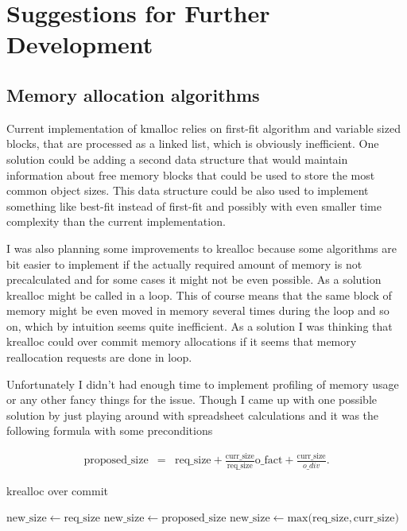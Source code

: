 \section{Suggestions for Further Development}

\subsection{Memory allocation algorithms}

Current implementation of kmalloc relies on first-fit algorithm and variable
sized blocks, that are processed as a linked list, which is obviously inefficient.
One solution could be adding a second data structure that would maintain
information about free memory blocks that could be used to store the most common
object sizes. This data structure could be also used to implement something like
best-fit instead of first-fit and possibly with even smaller time complexity than
the current implementation.

I was also planning some improvements to krealloc because some algorithms are
bit easier to implement if the actually required amount of memory is not
precalculated and for some cases it might not be even possible. As a solution
krealloc might be called in a loop. This of course means that the same block
of memory might be even moved in memory several times during the loop and so
on, which by intuition seems quite inefficient. As a solution I was thinking
that krealloc could over commit memory allocations if it seems that memory
reallocation requests are done in loop.

Unfortunately I didn't had enough time to implement profiling of memory usage
or any other fancy things for the issue. Though I came up with one possible
solution by just playing around with spreadsheet calculations and it was the
following formula with some preconditions

\begin{eqnarray}
\mathrm{proposed\_size} &=& \mathrm{req\_size}
  + \frac{\mathrm{curr\_size}}{\mathrm{req\_size}} \mathrm{o\_fact}
  + \frac{\mathrm{curr\_size}}{o\_div}.
\end{eqnarray}

\begin{algorithm}
  \caption{krealloc over commit}
  \label{algo:realloc_oc}
  \begin{algorithmic}
        \State $\mathrm{new\_size} \gets \mathrm{req\_size}$
      \Else
          \State $\mathrm{new\_size} \gets \mathrm{proposed\_size}$
        \Else
          \State $\mathrm{new\_size} \gets \mathrm{max(req\_size, curr\_size})$
        \EndIf
      \EndIf
  \end{algorithmic}
\end{algorithm}

